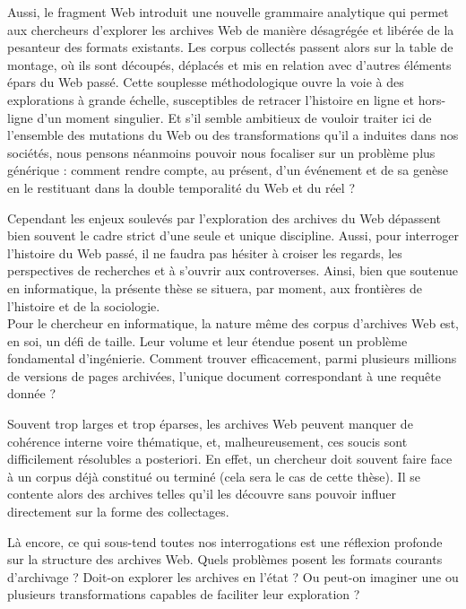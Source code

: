 \documentclass[symmetric,justified,marginals=raggedouter]{tufte-book}
\begin{document}
Aussi, le fragment Web introduit une nouvelle grammaire analytique qui permet aux chercheurs d'explorer les archives Web de manière désagrégée et libérée de la pesanteur des formats existants. Les corpus collectés passent alors sur la table de montage, où ils sont découpés, déplacés et mis en relation avec d'autres éléments épars du Web passé. Cette souplesse méthodologique ouvre la voie à des explorations à grande échelle, susceptibles de retracer l'histoire en ligne et hors-ligne d'un moment singulier. Et s'il semble ambitieux de vouloir traiter ici de l'ensemble des mutations du Web ou des transformations qu'il a induites dans nos sociétés, nous pensons néanmoins pouvoir nous focaliser sur un problème plus générique : comment rendre compte, au présent, d'un événement et de sa genèse en le restituant dans la double temporalité du Web et du réel ?

Cependant les enjeux soulevés par l'exploration des archives du Web dépassent bien souvent le cadre strict d'une seule et unique discipline. Aussi, pour interroger l'histoire du Web passé, il ne faudra pas hésiter à croiser les regards, les perspectives de recherches et à s'ouvrir aux controverses. Ainsi, bien que soutenue en informatique, la présente thèse se situera, par moment, aux frontières de l'histoire et de la sociologie.\\

\noindent Pour le chercheur en informatique, la nature même des corpus d'archives Web est, en soi, un défi de taille. Leur volume et leur étendue posent un problème fondamental d'ingénierie. Comment trouver efficacement, parmi plusieurs millions de versions de pages archivées, l'unique document correspondant à une requête donnée ? 

Souvent trop larges et trop éparses, les archives Web peuvent manquer de cohérence interne voire thématique, et, malheureusement, ces soucis sont difficilement résolubles a posteriori. En effet, un chercheur doit souvent faire face à un corpus déjà constitué ou terminé (cela sera le cas de cette thèse). Il se contente alors des archives telles qu'il les découvre sans pouvoir influer directement sur la forme des collectages. 

Là encore, ce qui sous-tend toutes nos interrogations est une réflexion profonde sur la structure des archives Web. Quels problèmes posent les formats courants d'archivage ? Doit-on explorer les archives en l'état ? Ou peut-on imaginer une ou plusieurs transformations capables de faciliter leur exploration ?\\
\end{document}
